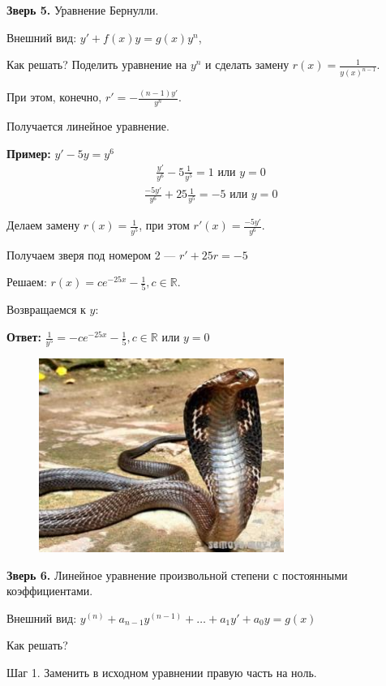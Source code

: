 \documentclass[10pt,a4paper]{article}
\begin{document}
\par \textbf{Зверь 5.} Уравнение Бернулли.
\par Внешний вид: $y' + f(x) y = g(x) y^n$,  
\par Как решать? Поделить уравнение на $y^n$ и сделать замену $r(x) = \frac1 {y(x)^{n-1}}$. 
\par При этом, конечно, $r' = - \frac{(n-1)y'}{y^n}$.
\par Получается линейное уравнение.
\par \textbf{Пример:} $y' - 5y = y^6$
\begin{eqnarray*}
\frac{y'}{y^6} - 5 \frac{1}{y^5} = 1 \text{ или } y = 0
\end{eqnarray*}
\begin{eqnarray*}
\frac{-5y'}{y^6} + 25 \frac{1}{y^5} = -5 \text{ или } y = 0
\end{eqnarray*}
\par Делаем замену $r(x) = \frac1 {y^5}$, при этом $r'(x) = \frac{-5y'}{y^6}$.
\par Получаем зверя под номером 2 --- $r' + 25r = -5$
\par Решаем: $r(x) = ce^{-25x} - \frac 1 5, c \in \mathbb{R}$.
\par Возвращаемся к $y$:
\par \textbf{Ответ:} $\frac 1 {y^5} = -ce^{-25x} - \frac 1 5, c \in \mathbb{R} \text{ или } y = 0$ \\
\newpage
\pagecolor{LimeGreen}
\begin{figure}[h]
\centering
\includegraphics[width = 8cm]{snake.jpg}
\end{figure}
\par \textbf{Зверь 6.} Линейное уравнение произвольной степени с постоянными коэффициентами.
\par Внешний вид: $y^{(n)} + a_{n-1}y^{(n-1)} + \dots + a_1y' + a_0y = g(x)$
\par Как решать?
\par Шаг 1. Заменить в исходном уравнении правую часть на ноль.
\end{document}
